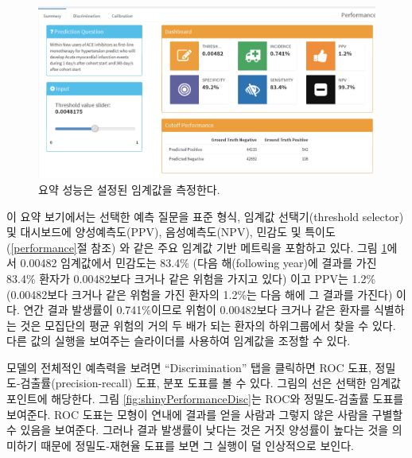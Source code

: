 \documentclass[11pt]{book}
\theoremstyle{definition}
\theoremstyle{definition}
\theoremstyle{definition}
\theoremstyle{remark}
\begin{document}
\begin{figure}

{\centering \includegraphics[width=1\linewidth]{images/PatientLevelPrediction/shiny/shinyPerformanceSum} 

}

\caption{요약 성능은 설정된 임계값을 측정한다.}\label{fig:shinyPerformanceSum}
\end{figure}

이 요약 보기에서는 선택한 예측 질문을 표준 형식, 임계값 선택기(threshold
selector) 및 대시보드에 양성예측도(PPV), 음성예측도(NPV), 민감도 및
특이도 (\ref{performance}절 참조) 와 같은 주요 임계값 기반 메트릭을
포함하고 있다. 그림 \ref{fig:shinyPerformanceSum}에서 0.00482 임계값에서
민감도는 83.4\% (다음 해(following year)에 결과를 가진 83.4\% 환자가
0.00482보다 크거나 같은 위험을 가지고 있다) 이고 PPV는 1.2\%
(0.00482보다 크거나 같은 위험을 가진 환자의 1.2\%는 다음 해에 그 결과를
가진다) 이다. 연간 결과 발생률이 0.741\%이므로 위험이 0.00482보다 크거나
같은 환자를 식별하는 것은 모집단의 평균 위험의 거의 두 배가 되는 환자의
하위그룹에서 찾을 수 있다. 다른 값의 실행을 보여주는 슬라이더를 사용하여
임계값을 조정할 수 있다.

모델의 전체적인 예측력을 보려면 ``Discrimination'' 탭을 클릭하면 ROC
도표, 정밀도-검출률(precision-recall) 도표, 분포 도표를 볼 수 있다.
그림의 선은 선택한 임계값 포인트에 해당한다. 그림
\ref{fig:shinyPerformanceDisc}는 ROC와 정밀도-검출률 도표를 보여준다.
ROC 도표는 모형이 연내에 결과를 얻을 사람과 그렇지 않은 사람을 구별할 수
있음을 보여준다. 그러나 결과 발생률이 낮다는 것은 거짓 양성률이 높다는
것을 의미하기 때문에 정밀도-재현율 도표를 보면 그 실행이 덜 인상적으로
보인다.
\end{document}
